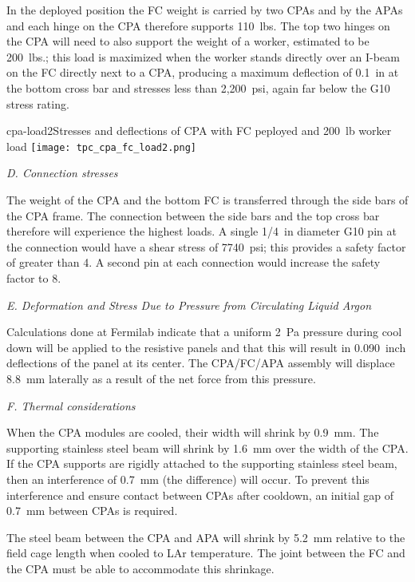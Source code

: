 In the deployed position the FC weight  is carried by two CPAs and by the APAs and each hinge on the CPA therefore supports 110~lbs.   The top two hinges on the CPA will need to also support the weight of a worker, estimated to be 200~lbs.; this load is maximized when the worker stands directly over an I-beam on the FC directly next to a CPA, producing a maximum deflection of 0.1~in at the bottom cross bar and stresses less than 2,200~psi, again far below the G10 stress rating.

\begin{cdrfigure}{cpa-load2}{Stresses and deflections of CPA with FC peployed and 200~lb worker load} 
\texttt{[image: tpc\_cpa\_fc\_load2.png]}
\end{cdrfigure}

{\it D. Connection stresses}

The weight of the CPA and the bottom FC is transferred through the side bars of the CPA frame.  The connection between the side bars and the top cross bar therefore will experience the highest loads.  A single 1/4~in diameter G10 pin at the connection would have a shear stress of 7740~psi; this provides a safety factor of greater than 4.  A second pin at each connection would increase the safety factor to 8.  

{\it E. Deformation and Stress Due to Pressure from Circulating Liquid Argon}

Calculations done at Fermilab indicate that a uniform 2~Pa pressure during cool down will be applied to the resistive panels  %
and that this will result in 0.090~inch deflections of the panel at its center.  The CPA/FC/APA assembly will displace 8.8~mm laterally as a result of the net force from this pressure.  

{\it F. Thermal considerations}

When the CPA modules are cooled, their width will shrink by 0.9~mm.  The supporting stainless steel beam will shrink by 1.6~mm over the width of the CPA.  If the CPA supports are rigidly attached to the supporting stainless steel beam, then an interference of 0.7~mm (the difference) will occur.  To prevent this interference and ensure contact between CPAs after cooldown, an initial gap of 0.7~mm between CPAs is required.  

The steel beam between the CPA and APA will shrink by 5.2~mm relative to the field cage length when cooled to LAr temperature.  The joint between the FC and the CPA must be able to accommodate this shrinkage.



